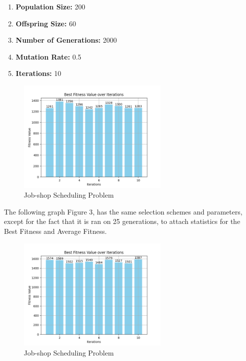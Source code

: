 \documentclass[12pt]{article}
\begin{document}
\begin{enumerate}
    \item \textbf{Population Size:} 200
    \item \textbf{Offspring Size:} 60
    \item \textbf{Number of Generations:} 2000
    \item \textbf{Mutation Rate:} 0.5
    \item \textbf{Iterations:} 10
\end{enumerate}

\begin{figure}[h]
    \centering
    \includegraphics[width=0.65\textwidth]{images/Figure_2.png}
    \caption{Job-shop Scheduling Problem}
\end{figure}

The following graph Figure 3, has the same selection schemes and parameters, except for the fact that it is ran on 25 generations, to attach statistics for the Best Fitness and Average Fitness.

\begin{figure}[h]
    \centering
    \includegraphics[width=0.65\textwidth]{images/JSSP_rntrbestscorelessgens.png}
    \caption{Job-shop Scheduling Problem}
\end{figure}
\end{document}
